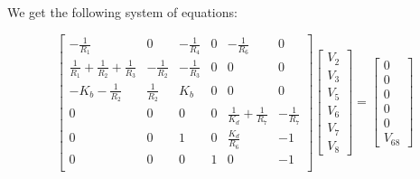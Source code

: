 We get the following system of equations:

\[
  \begin{bmatrix}
    -\frac{1}{R_1}                                & 0              & -\frac{1}{R_4} & 0 & -\frac{1}{R_6}                & 0              \\
    \frac{1}{R_1} + \frac{1}{R_2} + \frac{1}{R_3} & -\frac{1}{R_2} & -\frac{1}{R_3} & 0 & 0                             & 0              \\
    -K_b - \frac{1}{R_2}                          & \frac{1}{R_2}  & K_b            & 0 & 0                             & 0              \\
    0                                             & 0              & 0              & 0 & \frac{1}{K_d} + \frac{1}{R_7} & -\frac{1}{R_7} \\
    0                                             & 0              & 1              & 0 & \frac{K_d}{R_6}               & -1             \\
    0                                             & 0              & 0              & 1 & 0                             & -1             \\
  \end{bmatrix}
  \begin{bmatrix}
    V_2 \\ V_3 \\ V_5 \\ V_6 \\ V_7 \\ V_8
  \end{bmatrix}
  =
  \begin{bmatrix}
    0 \\ 0 \\ 0 \\ 0  \\ 0 \\ V_{68}
  \end{bmatrix}
\]

\hfill


